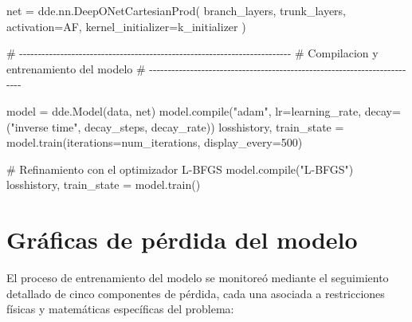 \documentclass[
  spanish,
  us-letterpaper,
]{scrreprt}
\newenvironment{Shaded}{\begin{snugshade}}{\end{snugshade}}
\newcommand{\BuiltInTok}[1]{\textcolor[rgb]{0.00,0.23,0.31}{#1}}
\newcommand{\CommentTok}[1]{\textcolor[rgb]{0.37,0.37,0.37}{#1}}
\newcommand{\DecValTok}[1]{\textcolor[rgb]{0.68,0.00,0.00}{#1}}
\newcommand{\NormalTok}[1]{\textcolor[rgb]{0.00,0.23,0.31}{#1}}
\newcommand{\OperatorTok}[1]{\textcolor[rgb]{0.37,0.37,0.37}{#1}}
\newcommand{\StringTok}[1]{\textcolor[rgb]{0.13,0.47,0.30}{#1}}
\theoremstyle{plain}
\theoremstyle{definition}
\theoremstyle{remark}
\begin{document}
\begin{Shaded}
\begin{Highlighting}[]
\NormalTok{net }\OperatorTok{=}\NormalTok{ dde.nn.DeepONetCartesianProd(}
\NormalTok{    branch\_layers,}
\NormalTok{    trunk\_layers,}
\NormalTok{    activation}\OperatorTok{=}\NormalTok{AF,}
\NormalTok{    kernel\_initializer}\OperatorTok{=}\NormalTok{k\_initializer}
\NormalTok{)}

\CommentTok{\# {-}{-}{-}{-}{-}{-}{-}{-}{-}{-}{-}{-}{-}{-}{-}{-}{-}{-}{-}{-}{-}{-}{-}{-}{-}{-}{-}{-}{-}{-}{-}{-}{-}{-}{-}{-}{-}{-}{-}{-}{-}{-}{-}{-}{-}{-}{-}{-}{-}{-}{-}{-}{-}{-}{-}{-}{-}{-}{-}{-}{-}{-}{-}{-}{-}{-}{-}{-}{-}{-}{-}{-}{-}}
\CommentTok{\# Compilacion y entrenamiento del modelo}
\CommentTok{\# {-}{-}{-}{-}{-}{-}{-}{-}{-}{-}{-}{-}{-}{-}{-}{-}{-}{-}{-}{-}{-}{-}{-}{-}{-}{-}{-}{-}{-}{-}{-}{-}{-}{-}{-}{-}{-}{-}{-}{-}{-}{-}{-}{-}{-}{-}{-}{-}{-}{-}{-}{-}{-}{-}{-}{-}{-}{-}{-}{-}{-}{-}{-}{-}{-}{-}{-}{-}{-}{-}{-}{-}{-}}

\NormalTok{model }\OperatorTok{=}\NormalTok{ dde.Model(data, net)}
\NormalTok{model.}\BuiltInTok{compile}\NormalTok{(}\StringTok{"adam"}\NormalTok{, lr}\OperatorTok{=}\NormalTok{learning\_rate,}
\NormalTok{            decay}\OperatorTok{=}\NormalTok{(}\StringTok{"inverse time"}\NormalTok{, decay\_steps, decay\_rate))}
\NormalTok{losshistory, train\_state }\OperatorTok{=}\NormalTok{ model.train(iterations}\OperatorTok{=}\NormalTok{num\_iterations,}
\NormalTok{display\_every}\OperatorTok{=}\DecValTok{500}\NormalTok{)}

\CommentTok{\# Refinamiento con el optimizador L{-}BFGS}
\NormalTok{model.}\BuiltInTok{compile}\NormalTok{(}\StringTok{"L{-}BFGS"}\NormalTok{)}
\NormalTok{losshistory, train\_state }\OperatorTok{=}\NormalTok{ model.train()}
\end{Highlighting}
\end{Shaded}

\section{Gráficas de pérdida del
modelo}\label{gruxe1ficas-de-puxe9rdida-del-modelo}

El proceso de entrenamiento del modelo se monitoreó mediante el
seguimiento detallado de cinco componentes de pérdida, cada una asociada
a restricciones físicas y matemáticas específicas del problema:
\end{document}
